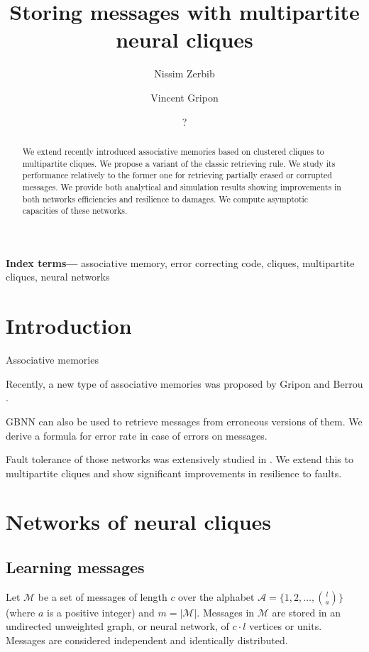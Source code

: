 \documentclass[english,11pt,twocolumn]{article}
\title{Storing messages with multipartite neural cliques}
\author[]{Nissim Zerbib}
\affil{Département d'Informatique, École normale supérieure, Paris, France}
\author[]{Vincent Gripon}
\affil{Département d'Électronique, Télécom Bretagne, Brest, France}
\author{?}
\date{
	}
\theoremstyle{definition}
\providecommand{\keywords}[1]{\textbf{Index terms---} #1}
\begin{document}
	\maketitle

	 \begin{abstract}
	 	We extend recently introduced associative memories based on clustered cliques to multipartite cliques. We propose a variant of the classic retrieving rule. We study its performance relatively to the former one for retrieving partially erased or corrupted messages. We provide both analytical and simulation results showing improvements in both networks efficiencies and resilience to damages. We compute asymptotic capacities of these networks.
	 \end{abstract}
	 
	\keywords{associative memory, error correcting code, cliques, multipartite cliques, neural networks}
	
	\section{Introduction}
	
		
		Associative memories
		
		Recently, a new type of associative memories was proposed by Gripon and Berrou \cite{GriBer20117}.
		
		GBNN can also be used to retrieve messages from erroneous versions of them. We derive a formula for error rate in case of errors on messages.
		
		Fault tolerance of those networks was extensively studied in \cite{LedGriRabGro20145}. We extend this to multipartite cliques and show significant improvements in resilience to faults.
	
	
	\section{Networks of neural cliques}
		
	\subsection{Learning messages}
		
	Let $\mathcal{M}$ be a set of messages of length $c$ over the alphabet $\mathcal{A} = \{1, 2, \hdots, {l \choose a}\}$ (where $a$ is a positive integer) and $m = | \mathcal{M} |$. Messages in $\mathcal{M}$ are stored in an undirected unweighted graph, or neural network, of $c \cdot l$ vertices or units. Messages are considered independent and identically distributed.
	
\end{document}

